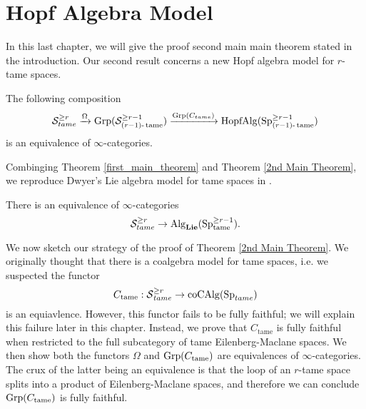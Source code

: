 \chapter{Hopf Algebra Model}

In this last chapter, we will give the proof second main main theorem stated in the introduction.
Our second result concerns a new Hopf algebra model for $r$-tame spaces. 
\begin{theorem}
\label{2nd Main Theorem}
The following composition 
$$
{\mathcal{S}}^{\geq r}_{tame} \xrightarrow{\Omega}
\operatorname{Grp}({\mathcal{S}}^{\geq r-1}_{(r-1)\text{-}\operatorname{\operatorname{tame}}})
\xrightarrow{\operatorname{Grp}(C_{tame})}
\operatorname{HopfAlg}(\operatorname{Sp}^{\geq r-1}_{(r-1)\text{-}\operatorname{\operatorname{tame}}})
$$
is an equivalence of $\infty$-categories.
\end{theorem}
Combinging Theorem \ref{first_main_theorem} and Theorem \ref{2nd Main Theorem}, we reproduce Dwyer's Lie algebra model for tame spaces in \cite{Dwyer}.
\begin{theorem}
\cite{Dwyer}
	There is an equivalence of $\infty$-categories
	\[
	{\mathcal{S}}^{\geq r}_{tame} 
	\to
	\operatorname{Alg}_{\mathbf{Lie}}(\operatorname{Sp}^{\geq r-1}_{\operatorname{\operatorname{tame}}}).
	\]
\end{theorem}

We now sketch our strategy of the proof of Theorem \ref{2nd Main Theorem}.
We originally thought that there is a coalgebra model for tame spaces, i.e. we suspected the functor
	$$
	C_{\operatorname{tame}}:\operatorname{\mathcal{S}}^{\geq r}_{tame}\to \operatorname{coCAlg}(\operatorname{Sp}_{tame})
	$$
	is an equiavlence. However, this functor fails to be fully faithful; we will explain this failure later in this chapter.
	Instead, we prove that $C_{\operatorname{tame}}$ is fully faithful when restricted to the full subcategory of tame Eilenberg-Maclane spaces.
We then show both the functors $\Omega$ and $\operatorname{Grp}(C_{\operatorname{tame}})$ are equivalences of $\infty$-categories. 
The crux of the latter being an equivalence is that the loop of an $r$-tame space splits into a product of Eilenberg-Maclane spaces, and therefore we can conclude $\operatorname{Grp}(C_{\operatorname{tame}})$ is fully faithful.


